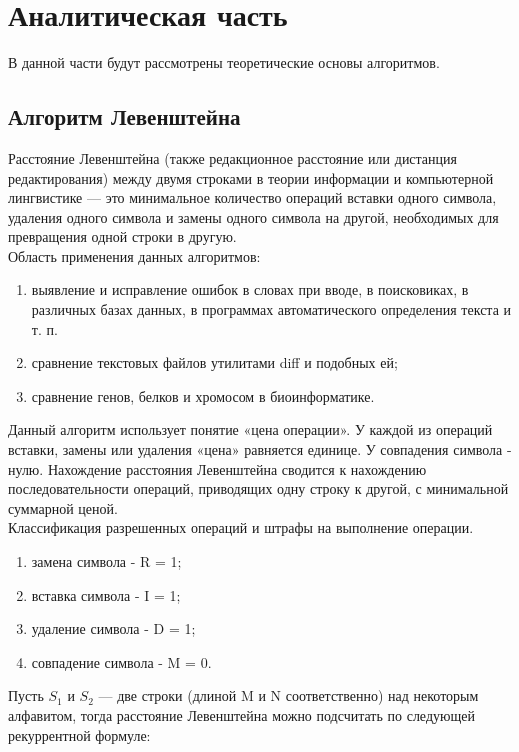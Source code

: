 \documentclass[a4paper, 14pt]{article}
\begin{document}
	\newpage
	\section{Аналитическая часть}
	
	В данной части будут рассмотрены теоретические основы алгоритмов.
	
	\subsection{Алгоритм Левенштейна}
	Расстояние Левенштейна (также редакционное расстояние или дистанция редактирования) между двумя строками в теории информации и компьютерной лингвистике — это минимальное количество операций вставки одного символа, удаления одного символа и замены одного символа на другой, необходимых для превращения одной строки в другую.\\
	
		Область применения данных алгоритмов:
	\begin{enumerate}
\item выявление и исправление ошибок в словах при вводе, в поисковиках, в различных базах данных, в программах автоматического определения текста и т. п.
\item сравнение текстовых файлов утилитами diff и подобных ей;
\item сравнение генов, белков и хромосом в биоинформатике.
	\end{enumerate}
	
	Данный алгоритм использует понятие «цена операции». У каждой из операций вставки, замены или удаления «цена» равняется единице. У совпадения символа - нулю. Нахождение расстояния Левенштейна сводится к нахождению последовательности операций, приводящих одну строку к другой, с минимальной суммарной ценой.	\\  
	
	Классификация разрешенных операций и штрафы на выполнение операции.
	\begin{enumerate}
\item замена символа - R = 1;
\item вставка символа - I = 1;
\item удаление символа - D = 1;
\item совпадение символа - M = 0.
	\end{enumerate}
	
	Пусть $S_{1}$ и $S_{2}$ — две строки (длиной M и N соответственно) над некоторым алфавитом, тогда расстояние Левенштейна можно подсчитать по следующей рекуррентной формуле:
\end{document}
